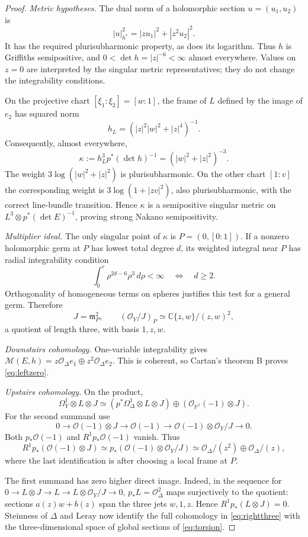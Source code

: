 \documentclass[11pt,reqno]{amsart}
\numberwithin{equation}{section}
\theoremstyle{definition}
\theoremstyle{remark}
\newcommand{\OO}{\mathcal O}
\newcommand{\MM}{\mathcal M}
\newcommand{\PP}{\mathbb P}
\newcommand{\CC}{\mathbb C}
\begin{document}
\begin{proof}
\emph{Metric hypotheses.}
The dual norm of a holomorphic section $u=(u_1,u_2)$ is
\[
 |u|_{h^*}^2=|zu_1|^2+|z^2u_2|^2.
\]
It has the required plurisubharmonic property, as does its logarithm.
Thus $h$ is Griffiths semipositive, and
$0<\det h=|z|^{-6}<\infty$ almost everywhere.
Values on $z=0$ are interpreted by the singular metric representatives;
they do not change the integrability conditions.

On the projective chart $[\xi_1:\xi_2]=[w:1]$, the frame of $L$ defined
by the image of $e_2$ has squared norm
\[
 h_L=(|z|^2|w|^2+|z|^4)^{-1}.
\]
Consequently, almost everywhere,
\begin{equation}\label{eq:metriccounter}
 \kappa:=h_L^3p^*(\det h)^{-1}
          =(|w|^2+|z|^2)^{-3}.
\end{equation}
The weight $3\log(|w|^2+|z|^2)$ is plurisubharmonic. On the other chart
$[1:v]$ the corresponding weight is $3\log(1+|zv|^2)$, also
plurisubharmonic, with the correct line-bundle transition. Hence
$\kappa$ is a semipositive singular metric on
$L^3\otimes p^*(\det E)^{-1}$, proving strong Nakano semipositivity.

\emph{Multiplier ideal.}
The only singular point of $\kappa$ is $P=(0,[0:1])$.
If a nonzero holomorphic germ at $P$ has lowest total degree $d$, its
weighted integral near $P$ has radial integrability condition
\[
 \int_0^\varepsilon \rho^{2d-6}\rho^3\,d\rho<\infty
 \quad\Longleftrightarrow\quad d\geq2.
\]
Orthogonality of homogeneous terms on spheres justifies this test for a
general germ. Therefore
\begin{equation}\label{eq:J}
 J=\mathfrak m_P^2,\qquad
 (\OO_Y/J)_P\simeq\CC\{z,w\}/(z,w)^2,
\end{equation}
a quotient of length three, with basis $1,z,w$.

\emph{Downstairs cohomology.}
One-variable integrability gives
$\MM(E,h)=z\OO_\Delta e_1\oplus z^2\OO_\Delta e_2$.
This is coherent, so Cartan's theorem B proves \eqref{eq:leftzero}.

\emph{Upstairs cohomology.}
On the product,
\[
 \Omega_Y^1\otimes L\otimes J
 \simeq (p^*\Omega_\Delta^1\otimes L\otimes J)
                  \oplus(\OO_{\PP^1}(-1)\otimes J).
\]
For the second summand use
\[
 0\longrightarrow\OO(-1)\otimes J\longrightarrow\OO(-1)
 \longrightarrow\OO(-1)\otimes\OO_Y/J\longrightarrow0.
\]
Both $p_*\OO(-1)$ and $R^1p_*\OO(-1)$ vanish. Thus
\begin{equation}\label{eq:torsion}
 R^1p_*(\OO(-1)\otimes J)
 \simeq p_*(\OO(-1)\otimes\OO_Y/J)
 \simeq \OO_\Delta/(z^2)\oplus\OO_\Delta/(z),
\end{equation}
where the last identification is after choosing a local frame at $P$.

The first summand has zero higher direct image. Indeed, in the sequence
for $0\to L\otimes J\to L\to L\otimes\OO_Y/J\to0$,
$p_*L=\OO_\Delta^2$ maps surjectively to the quotient: sections
$a(z)w+b(z)$ span the three jets $w,1,z$. Hence
$R^1p_*(L\otimes J)=0$. Steinness of $\Delta$ and Leray now identify
the full cohomology in \eqref{eq:rightthree} with the three-dimensional
space of global sections of \eqref{eq:torsion}.
\end{proof}
\end{document}
